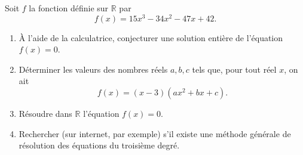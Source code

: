 \documentclass[11pt]{article}
\begin{document}
\begin{exo}
  Soit $f$ la fonction définie sur $\mathbb{R}$ par
  \[
    f(x) = 15x^3-34x^2-47x+42.
  \]
  \begin{enumerate}
    \item À l'aide de la calculatrice, conjecturer une solution entière de
      l'équation $f(x)=0$.
    \item Déterminer les valeurs des nombres réels $a,b,c$ tels que, pour tout
      réel $x$, on ait
      \[
        f(x) = (x-3)(ax^2+bx+c).
      \]
    \item Résoudre dans $\mathbb{R}$ l'équation $f(x)=0$.
    \item Rechercher (sur internet, par exemple) s'il existe une méthode générale de résolution des
      équations du troisième degré.
  \end{enumerate}
\end{exo}
\end{document}
